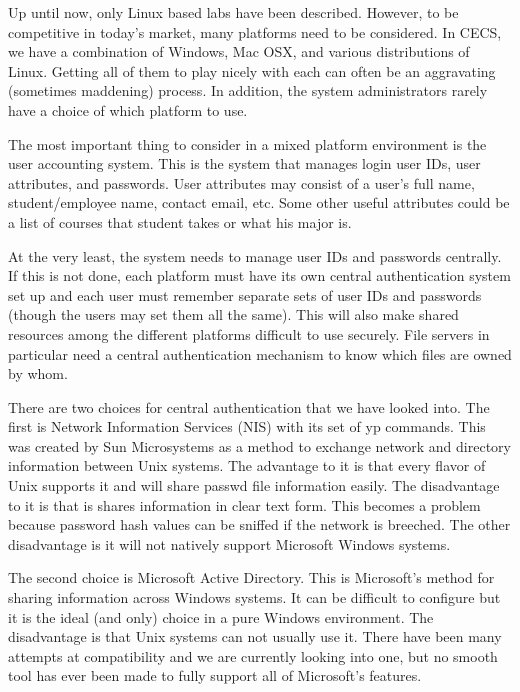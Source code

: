 Up until now, only Linux based labs have been described.  However, to be competitive in today's market, many platforms need to be considered.  In CECS, we have a combination of Windows, Mac OSX, and various distributions of Linux.   Getting all of them to play nicely with each can often be an aggravating (sometimes maddening) process.  In addition, the system administrators rarely have a choice of which platform to use.   

The most important thing to consider in a mixed platform environment is the user accounting system.  This is the system that manages login user IDs, user attributes, and passwords.  User attributes may consist of a user's full name, student/employee name, contact email, etc.  Some other useful attributes could be a list of courses that student takes or what his major is.  

At the very least, the system needs to manage user IDs and passwords centrally.  If this is not done, each platform must have its own central authentication system set up and each user must remember separate sets of user IDs and passwords (though the users may set them all the same).  This will also make shared resources among the different platforms difficult to use securely.  File servers in particular need a central authentication mechanism to know which files are owned by whom.  

There are two choices for central authentication that we have looked into.  The first is Network Information Services (NIS) with its set of yp commands.  This was created by Sun Microsystems as a method to exchange network and directory information between Unix systems.  The advantage to it is that every flavor of Unix supports it and will share passwd file information easily.  The disadvantage to it is that is shares information in clear text form.  This becomes a problem because password hash values can be sniffed if the network is breeched.  The other disadvantage is it will not natively support Microsoft Windows systems.  

The second choice is Microsoft Active Directory.  This is Microsoft's method for sharing information across Windows systems.  It can be difficult to configure but it is the ideal (and only) choice in a pure Windows environment.  The disadvantage is that Unix systems can not usually use it.  There have been many attempts at compatibility and we are currently looking into one, but no smooth tool has ever been made to fully support all of Microsoft's features.  

